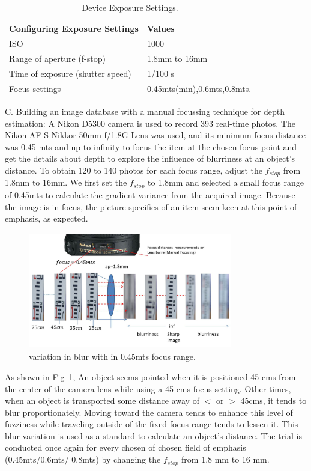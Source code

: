 \documentclass[sn-mathphys]{sn-jnl}%
\theoremstyle{thmstyleone}%
\theoremstyle{thmstyletwo}%
\theoremstyle{thmstylethree}%
\begin{document}
\begin{table}[t]
	\caption{Device Exposure Settings.}
	\label{tab:cameraexp}
	  \centering
		 \begin{tabular}{|l l |}
		  \hline
		    Configuring Exposure Settings  & Values \\
		   \hline
		    ISO & 1000 \\
		   \hline
		    Range of aperture (f-stop) & 1.8mm to 16mm
				\\
		   \hline
		    Time of exposure (shutter speed) & 1/100 s \\
		   \hline
			 Focus settings & 0.45mts(min),0.6mts,0.8mts.\\
		   \hline
     \end{tabular}
	\end{table}
 C. {Building an image database with a manual focussing technique for depth estimation}: A Nikon D5300 camera is used to record 393 real-time photos. The Nikon AF-S Nikkor 50mm f/1.8G Lens was used, and its minimum focus distance was 0.45 mts and up to infinity to focus the item at the chosen focus point and get the details about depth to explore the influence of blurriness at an object's distance. To obtain 120 to 140 photos for each focus range, adjust the  $f_{stop}$ from 1.8mm to 16mm. We first set the  $f_{stop}$ to 1.8mm and selected a small focus range of 0.45mts to calculate the gradient variance from the acquired image. Because the image is in focus, the picture specifics of an item seem keen at this point of emphasis, as expected.

\begin{figure}[!htbp]
\centerline{\includegraphics[height=2in,width=3.5in]{focusblur.jpg}}
\caption{variation in blur with in 0.45mts focus range.}
\label{Fig:Fig5}
\end{figure}\par

 
As shown in Fig~\ref{Fig:Fig5}, An object seems pointed when it is positioned 45 cms from the center of the camera lens while using a 45 cms focus setting. Other times, when an object is transported some distance away of $<$ or $>$ 45cms, it tends to blur proportionately. Moving toward the camera tends to enhance this level of fuzziness while traveling outside of the fixed focus range tends to lessen it. This blur variation is used as a standard to calculate an object's distance. The trial is conducted once again for every chosen 
of chosen field of emphasis (0.45mts/0.6mts/ 0.8mts) by changing the  $f_{stop}$ from 1.8 mm to 16 mm. 
\end{document}
